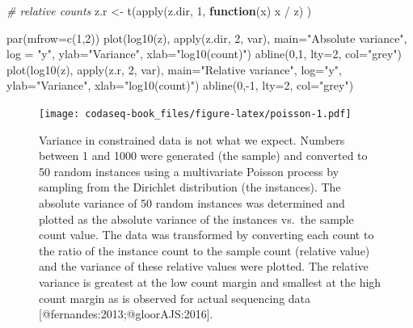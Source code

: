 \documentclass[
  onecolumn]{article}
\newenvironment{Shaded}{\begin{snugshade}}{\end{snugshade}}
\newcommand{\AttributeTok}[1]{\textcolor[rgb]{0.77,0.63,0.00}{#1}}
\newcommand{\CommentTok}[1]{\textcolor[rgb]{0.56,0.35,0.01}{\textit{#1}}}
\newcommand{\ControlFlowTok}[1]{\textcolor[rgb]{0.13,0.29,0.53}{\textbf{#1}}}
\newcommand{\DecValTok}[1]{\textcolor[rgb]{0.00,0.00,0.81}{#1}}
\newcommand{\FunctionTok}[1]{\textcolor[rgb]{0.00,0.00,0.00}{#1}}
\newcommand{\NormalTok}[1]{#1}
\newcommand{\OtherTok}[1]{\textcolor[rgb]{0.56,0.35,0.01}{#1}}
\newcommand{\SpecialCharTok}[1]{\textcolor[rgb]{0.00,0.00,0.00}{#1}}
\newcommand{\StringTok}[1]{\textcolor[rgb]{0.31,0.60,0.02}{#1}}
\begin{document}
\begin{Shaded}
\begin{Highlighting}[]
\CommentTok{\# relative counts}
\NormalTok{z.r }\OtherTok{\textless{}{-}} \FunctionTok{t}\NormalTok{(}\FunctionTok{apply}\NormalTok{(z.dir, }\DecValTok{1}\NormalTok{, }\ControlFlowTok{function}\NormalTok{(x) x }\SpecialCharTok{/}\NormalTok{ z) )}

\FunctionTok{par}\NormalTok{(}\AttributeTok{mfrow=}\FunctionTok{c}\NormalTok{(}\DecValTok{1}\NormalTok{,}\DecValTok{2}\NormalTok{))}
\FunctionTok{plot}\NormalTok{(}\FunctionTok{log10}\NormalTok{(z), }\FunctionTok{apply}\NormalTok{(z.dir, }\DecValTok{2}\NormalTok{, var), }\AttributeTok{main=}\StringTok{"Absolute variance"}\NormalTok{, }\AttributeTok{log =} \StringTok{"y"}\NormalTok{,}
    \AttributeTok{ylab=}\StringTok{"Variance"}\NormalTok{, }\AttributeTok{xlab=}\StringTok{"log10(count)"}\NormalTok{)}
\FunctionTok{abline}\NormalTok{(}\DecValTok{0}\NormalTok{,}\DecValTok{1}\NormalTok{, }\AttributeTok{lty=}\DecValTok{2}\NormalTok{, }\AttributeTok{col=}\StringTok{"grey"}\NormalTok{)}
\FunctionTok{plot}\NormalTok{(}\FunctionTok{log10}\NormalTok{(z), }\FunctionTok{apply}\NormalTok{(z.r, }\DecValTok{2}\NormalTok{, var), }\AttributeTok{main=}\StringTok{"Relative variance"}\NormalTok{, }\AttributeTok{log=}\StringTok{"y"}\NormalTok{,}
    \AttributeTok{ylab=}\StringTok{"Variance"}\NormalTok{, }\AttributeTok{xlab=}\StringTok{"log10(count)"}\NormalTok{)}
\FunctionTok{abline}\NormalTok{(}\DecValTok{0}\NormalTok{,}\SpecialCharTok{{-}}\DecValTok{1}\NormalTok{, }\AttributeTok{lty=}\DecValTok{2}\NormalTok{, }\AttributeTok{col=}\StringTok{"grey"}\NormalTok{)}
\end{Highlighting}
\end{Shaded}

\begin{figure}
\centering
\texttt{[image: codaseq-book\_files/figure-latex/poisson-1.pdf]}
\caption{\label{fig:poisson}Variance in constrained data is not what we expect. Numbers between 1 and 1000 were generated (the sample) and converted to 50 random instances using a multivariate Poisson process by sampling from the Dirichlet distribution (the instances). The absolute variance of 50 random instances was determined and plotted as the absolute variance of the instances vs.~the sample count value. The data was transformed by converting each count to the ratio of the instance count to the sample count (relative value) and the variance of these relative values were plotted. The relative variance is greatest at the low count margin and smallest at the high count margin as is observed for actual sequencing data {[}@fernandes:2013;@gloorAJS:2016{]}.}
\end{figure}
\end{document}
